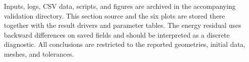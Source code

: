 Inputs, logs, CSV data, scripts, and figures are archived in the accompanying validation directory. This section source and the six plots are stored there together with the result drivers and parameter tables. The energy residual uses backward differences on saved fields and should be interpreted as a discrete diagnostic. All conclusions are restricted to the reported geometries, initial data, meshes, and tolerances.
